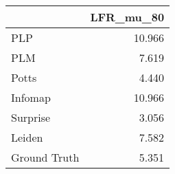 \begin{tabular}{lr}
\toprule
{} & LFR_mu_80 \\
\midrule
PLP          &    10.966 \\
PLM          &     7.619 \\
Potts        &     4.440 \\
Infomap      &    10.966 \\
Surprise     &     3.056 \\
Leiden       &     7.582 \\
Ground Truth &     5.351 \\
\bottomrule
\end{tabular}
